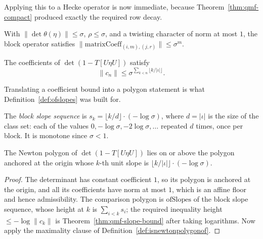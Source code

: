 Applying this to a Hecke operator is now immediate, because
Theorem~\ref{thm:qmf-compact} produced exactly the required row decay.

\begin{proposition}
  \label{prop:qmf-row-decay}
  \leanok
  With $\lVert \det\theta(\eta)\rVert \leq \sigma$, $\rho \leq \sigma$, and a twisting character
  of norm at most $1$, the block operator satisfies $\lVert \mathrm{matrixCoeff}_{(i,m),(j,r)}
  \rVert \leq \sigma^{m}$.
\end{proposition}

\begin{theorem}
  \label{thm:qmf-slope-bound}
  \leanok
  The coefficients of $\det(1 - T[U\eta U])$ satisfy
  \[
    \lVert c_n \rVert \leq \sigma^{\sum_{k < n}\lfloor k/\lvert \iota\rvert\rfloor}.
  \]
\end{theorem}

Translating a coefficient bound into a polygon statement is what
Definition~\ref{def:ofslopes} was built for.

\begin{definition}
  \label{def:blockslopes}
  \leanok
  The \emph{block slope sequence} is $s_k = \lfloor k/d \rfloor \cdot (-\log \sigma)$, where $d =
  \lvert \iota \rvert$ is the size of the class set: each of the values $0, -\log\sigma,
  -2\log\sigma, \dots$ repeated $d$ times, once per block.  It is monotone since $\sigma < 1$.
\end{definition}

\begin{theorem}
  \label{thm:qmf-slope-theorem}
  \leanok
  The Newton polygon of $\det(1 - T[U\eta U])$ lies on or above the polygon anchored at the
  origin whose $k$-th unit slope is $\lfloor k/\lvert\iota\rvert\rfloor \cdot (-\log \sigma)$.
\end{theorem}

\begin{proof}
  \leanok
  The determinant has constant coefficient $1$, so its polygon is anchored at the origin, and all
  its coefficients have norm at most $1$, which is an affine floor and hence admissibility.  The
  comparison polygon is $\mathrm{ofSlopes}$ of the block slope sequence, whose height at $k$ is
  $\sum_{i<k} s_i$; the required inequality height $\leq -\log\lVert c_k\rVert$ is
  Theorem~\ref{thm:qmf-slope-bound} after taking logarithms.  Now apply the maximality clause of
  Definition~\ref{def:isnewtonpolygonof}.
\end{proof}

